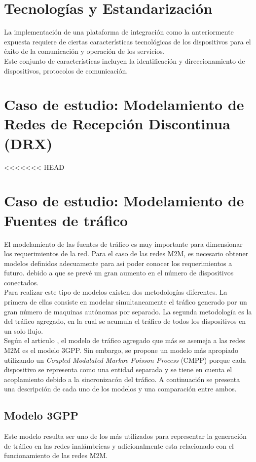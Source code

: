 \documentclass[journal]{IEEEtran}
\begin{document}
\section{Tecnologías y Estandarización}

La implementación de una plataforma de integración como la anteriormente expuesta requiere de ciertas características tecnológicas de los dispositivos para el éxito de la comunicación y operación de los servicios.\\

Este conjunto de características incluyen la identificación y direccionamiento de dispositivos, protocolos de comunicación.

\section{Caso de estudio: Modelamiento de Redes de Recepción Discontinua (DRX)}
<<<<<<< HEAD
\section{Caso de estudio: Modelamiento de Fuentes de tráfico}
El modelamiento de las fuentes de tráfico es muy importante para dimensionar los requerimientos de la red. Para el caso de las redes M2M, es necesario obtener modelos definidos adecuamente para asi poder conocer los requerimientos a futuro. debido a que se prevé un gran aumento en el número de dispositivos conectados.\\

Para realizar este tipo de modelos existen dos metodologías diferentes. La primera de ellas consiste en modelar simultaneamente el tráfico generado por un gran número de maquinas autónomas por separado. La segunda metodología es la del tráfico agregado, en la cual se acumula el tráfico de todos los dispositivos en un solo flujo.\\
 
Según el articulo \cite{art3}, el modelo de tr\'afico agregado que m\'as se asemeja a las redes M2M es el modelo 3GPP. Sin embargo, se propone un modelo m\'as apropiado utilizando un \emph{Coupled Modulated Markov Poisson Process} (CMPP) porque cada dispositivo se representa como una entidad separada y se tiene en cuenta el acoplamiento debido a la sincronizac\'on del tr\'afico. A continuaci\'on se presenta una descripci\'on de cada uno de los modelos y una comparaci\'on entre ambos.
\subsection{Modelo 3GPP}
Este modelo resulta ser uno de los m\'as utilizados para representar la generaci\'on de tr\'afico en las redes inal\'ambricas y adicionalmente esta relacionado con el funcionamiento de las redes M2M.\\
\end{document}
